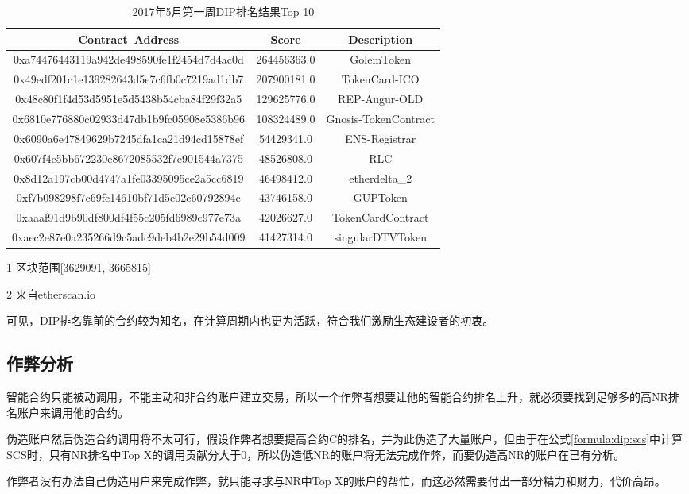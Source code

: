 \begin{table}[h]
\label{table:dip}
\centering
\begin{threeparttable}[b]
\caption{2017年5月第一周DIP排名结果Top 10} 
\begin{tabular}{ccc} \toprule
    {Contract~Address} & {Score} & {Description\tnote{2}} \\ \midrule
0xa74476443119a942de498590fe1f2454d7d4ac0d & 264456363.0 & GolemToken \\
0x49edf201c1e139282643d5e7c6fb0c7219ad1db7 & 207900181.0 & TokenCard-ICO \\
0x48c80f1f4d53d5951e5d5438b54cba84f29f32a5 & 129625776.0 & REP-Augur-OLD \\
0x6810e776880c02933d47db1b9fc05908e5386b96 & 108324489.0 & Gnosis-TokenContract \\
0x6090a6e47849629b7245dfa1ca21d94cd15878ef & 54429341.0 & ENS-Registrar \\
0x607f4c5bb672230e8672085532f7e901544a7375 & 48526808.0 & RLC \\
0x8d12a197cb00d4747a1fe03395095ce2a5cc6819 & 46498412.0 & etherdelta\_2 \\
0xf7b098298f7c69fc14610bf71d5e02c60792894c & 43746158.0 & GUPToken \\
0xaaaf91d9b90df800df4f55c205fd6989c977e73a & 42026627.0 & TokenCardContract \\
0xaec2e87e0a235266d9c5adc9deb4b2e29b54d009 & 41427314.0 & singularDTVToken \\
\bottomrule                                                     
\end{tabular}	
\begin{tablenotes}
  \small
  \item[1] 区块范围[3629091, 3665815]
  \item[2] 来自etherscan.io
\end{tablenotes}
\end{threeparttable}
\end{table}

可见，DIP排名靠前的合约较为知名，在计算周期内也更为活跃，符合我们激励生态建设者的初衷。

\subsection{作弊分析}
\label{dip:sybil}

智能合约只能被动调用，不能主动和非合约账户建立交易，所以一个作弊者想要让他的智能合约排名上升，就必须要找到足够多的高NR排名账户来调用他的合约。

伪造账户然后伪造合约调用将不太可行，假设作弊者想要提高合约C的排名，并为此伪造了大量账户，但由于在公式\ref{formula:dip:scs}中计算SCS时，只有NR排名中Top X的调用贡献分大于0，所以伪造低NR的账户将无法完成作弊，而要伪造高NR的账户在已有分析。

作弊者没有办法自己伪造用户来完成作弊，就只能寻求与NR中Top X的账户的帮忙，而这必然需要付出一部分精力和财力，代价高昂。

